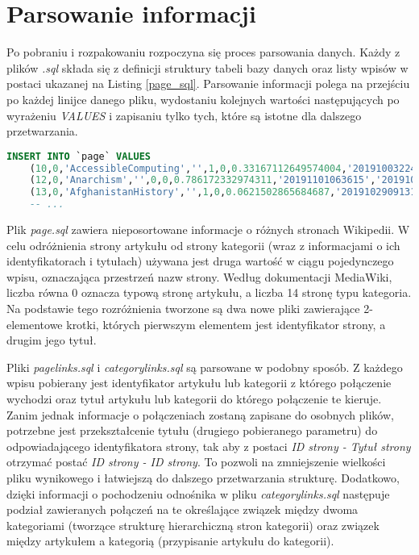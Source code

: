 \section{Parsowanie informacji}
Po pobraniu i rozpakowaniu rozpoczyna się proces parsowania danych. Każdy z plików \textit{.sql} składa się z definicji struktury tabeli bazy danych oraz listy wpisów w postaci ukazanej na Listing \ref{page_sql}. Parsowanie informacji polega na przejściu po każdej linijce danego pliku, wydostaniu kolejnych wartości następujących po wyrażeniu \textit{VALUES} i zapisaniu tylko tych, które są istotne dla dalszego przetwarzania.

\begin{lstlisting}[language=SQL,frame=single,caption={Fragment pliku enwiki-20191101-page.sql zawierający dane o stronach},label=page_sql]
INSERT INTO `page` VALUES
    (10,0,'AccessibleComputing','',1,0,0.33167112649574004,'20191003224230','20190105021557',854851586,94,'wikitext',NULL),
    (12,0,'Anarchism','',0,0,0.786172332974311,'20191101063615','20191031183024',923631615,104479,'wikitext',NULL),
    (13,0,'AfghanistanHistory','',1,0,0.0621502865684687,'20191029091312','20190618192734',783865149,90,'wikitext',NULL),
    -- ...
\end{lstlisting}

Plik \textit{page.sql} zawiera nieposortowane informacje o różnych stronach Wikipedii. W celu odróżnienia strony artykułu od strony kategorii (wraz z informacjami o ich identyfikatorach i tytułach) używana jest druga wartość w ciągu pojedynczego wpisu, oznaczająca przestrzeń nazw strony. Według dokumentacji MediaWiki, liczba równa 0 oznacza typową stronę artykułu, a liczba 14 stronę typu kategoria. Na podstawie tego rozróżnienia tworzone są dwa nowe pliki zawierające 2-elementowe krotki, których pierwszym elementem jest identyfikator strony, a drugim jego tytuł.

Pliki \textit{pagelinks.sql} i \textit{categorylinks.sql} są parsowane w podobny sposób. Z każdego wpisu pobierany jest identyfikator artykułu lub kategorii z którego połączenie wychodzi oraz tytuł artykułu lub kategorii do którego połączenie te kieruje. Zanim jednak informacje o połączeniach zostaną zapisane do osobnych plików, potrzebne jest przekształcenie tytułu (drugiego pobieranego parametru) do odpowiadającego identyfikatora strony, tak aby z postaci \textit{ID strony - Tytuł strony} otrzymać postać \textit{ID strony - ID strony}. To pozwoli na zmniejszenie wielkości pliku wynikowego i łatwiejszą do dalszego przetwarzania strukturę. Dodatkowo, dzięki informacji o pochodzeniu odnośnika w pliku \textit{categorylinks.sql} następuje podział zawieranych połączeń na te określające związek między dwoma kategoriami (tworzące strukturę hierarchiczną stron kategorii) oraz związek między artykułem a kategorią (przypisanie artykułu do kategorii).

